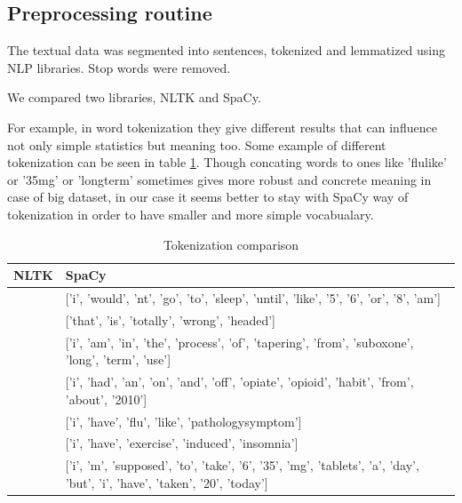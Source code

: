 \documentclass[11pt]{article}
\begin{document}
\subsection{Preprocessing routine}

The textual data was segmented into sentences, tokenized and lemmatized using NLP
libraries. Stop words were removed.

We compared two libraries, NLTK and SpaCy.

For example, in word tokenization they give different results that can influence not only simple statistics but meaning too. Some example of different tokenization can be seen in table \ref{token_dif}. Though concating words to ones like 'flulike' or '35mg' or 'longterm' sometimes gives more robust and concrete meaning in case of big dataset, in our case it seems better to stay with SpaCy way of tokenization in order to have smaller and more simple vocabualary.

\begin{center}
\begin{table}
\begin{tabular}{ |p{7cm}|p{7cm}| }
\hline
NLTK & SpaCy \\ \hline
['i', 'wouldnt', 'go', 'to', 'sleep', 'until', 'like', '5', '6', 'or', '8am'] & 
['i', 'would', 'nt', 'go', 'to', 'sleep', 'until', 'like', '5', '6', 'or', '8', 'am'] \\ \hline
['that', 'is', 'totally', 'wrongheaded'] & ['that', 'is', 'totally', 'wrong', 'headed'] \\ \hline
['i', 'am', 'in', 'the', 'process', 'of', 'tapering', 'from', 'suboxone', 'longterm', 'use'] & 
['i', 'am', 'in', 'the', 'process', 'of', 'tapering', 'from', 'suboxone', 'long', 'term', 'use'] \\ \hline
['i', 'had', 'an', 'onandoff', 'opiateopioid', 'habit', 'from', 'about', '2010'] & 
['i', 'had', 'an', 'on', 'and', 'off', 'opiate', 'opioid', 'habit', 'from', 'about', '2010'] \\ 
\hline
['i', 'have', 'flulike', 'pathologysymptom'] & ['i', 'have', 'flu', 'like', 'pathologysymptom'] \\ \hline
['i', 'have', 'exerciseinduced', 'insomnia'] & ['i', 'have', 'exercise', 'induced', 'insomnia'] \\ \hline
['i', 'm', 'supposed', 'to', 'take', '6', '35mg', 'tablets', 'a', 'day', 'but', 'i', 'have', 'taken', '20', 'today'] & 
['i', 'm', 'supposed', 'to', 'take', '6', '35', 'mg', 'tablets', 'a', 'day', 'but', 'i', 'have', 'taken', '20', 'today'] \\ 
\hline
\end{tabular}	
\caption{Tokenization comparison}\label{token_dif}
\end{table}
\end{center}
\FloatBarrier
\end{document}
